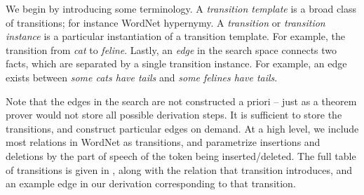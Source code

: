 %
%
We begin by introducing some terminology.
A \textit{transition template} is a broad class of transitions; for
  instance WordNet hypernymy.
A \textit{transition} or \textit{transition instance} is a particular
  instantiation of a transition template.
For example, the transition from \textit{cat} to \textit{feline}.
Lastly, an \textit{edge} in the search space connects two facts, which
  are separated by a single transition instance.
For example, an edge exists between 
  \textit{some cats have tails} and \textit{some felines have tails}.

Note that the edges in the search are not constructed a priori --
  just as a theorem prover would not store all possible derivation steps.
It is sufficient to store the transitions, and construct particular
  edges on demand.
At a high level, we include most relations in WordNet as transitions,
  and parametrize insertions and deletions by the part of speech
  of the token being inserted/deleted.
The full table of transitions is given in , along
  with the relation that transition introduces, and an example edge
  in our derivation corresponding to that transition.

